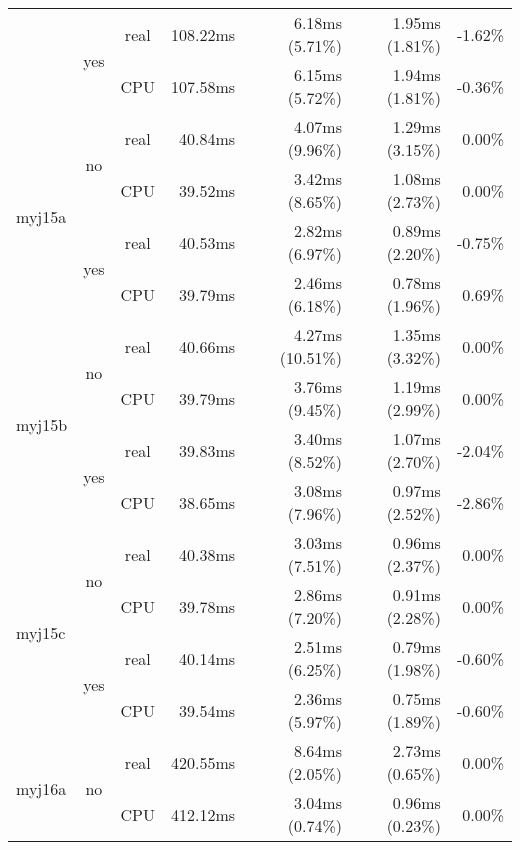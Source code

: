 \documentclass[en]{pracamgr}
\begin{document}
\begin{appendices}
\begin{small}
\begin{longtable}{|l|c|c|r|r|r|r|}
                          \cline{2-7}
                          & \multirow{2}{*}{yes} & real & 108.22ms & 6.18ms (5.71\%) & 1.95ms (1.81\%) & -1.62\% \\*
                          &                      & CPU  & 107.58ms & 6.15ms (5.72\%) & 1.94ms (1.81\%) & -0.36\% \\
\hline
\multirow{4}{*}{myj15a}   & \multirow{2}{*}{no}  & real & 40.84ms & 4.07ms (9.96\%) & 1.29ms (3.15\%) & 0.00\% \\*
                          &                      & CPU  & 39.52ms & 3.42ms (8.65\%) & 1.08ms (2.73\%) & 0.00\% \\*
                          \cline{2-7}
                          & \multirow{2}{*}{yes} & real & 40.53ms & 2.82ms (6.97\%) & 0.89ms (2.20\%) & -0.75\% \\*
                          &                      & CPU  & 39.79ms & 2.46ms (6.18\%) & 0.78ms (1.96\%) & 0.69\% \\
\hline
\multirow{4}{*}{myj15b}   & \multirow{2}{*}{no}  & real & 40.66ms & 4.27ms (10.51\%) & 1.35ms (3.32\%) & 0.00\% \\*
                          &                      & CPU  & 39.79ms & 3.76ms (9.45\%) & 1.19ms (2.99\%) & 0.00\% \\*
                          \cline{2-7}
                          & \multirow{2}{*}{yes} & real & 39.83ms & 3.40ms (8.52\%) & 1.07ms (2.70\%) & -2.04\% \\*
                          &                      & CPU  & 38.65ms & 3.08ms (7.96\%) & 0.97ms (2.52\%) & -2.86\% \\
\hline
\multirow{4}{*}{myj15c}   & \multirow{2}{*}{no}  & real & 40.38ms & 3.03ms (7.51\%) & 0.96ms (2.37\%) & 0.00\% \\*
                          &                      & CPU  & 39.78ms & 2.86ms (7.20\%) & 0.91ms (2.28\%) & 0.00\% \\*
                          \cline{2-7}
                          & \multirow{2}{*}{yes} & real & 40.14ms & 2.51ms (6.25\%) & 0.79ms (1.98\%) & -0.60\% \\*
                          &                      & CPU  & 39.54ms & 2.36ms (5.97\%) & 0.75ms (1.89\%) & -0.60\% \\
\hline
\multirow{4}{*}{myj16a}   & \multirow{2}{*}{no}  & real & 420.55ms & 8.64ms (2.05\%) & 2.73ms (0.65\%) & 0.00\% \\*
                          &                      & CPU  & 412.12ms & 3.04ms (0.74\%) & 0.96ms (0.23\%) & 0.00\% \\*

\end{longtable}
\end{small}
\end{appendices}
\end{document}
